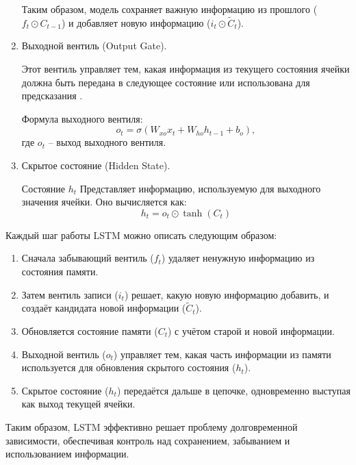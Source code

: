\documentclass[bachelor, och, coursework]{SCWorks}
\begin{document}
\begin{enumerate}
    Таким образом, модель сохраняет важную информацию из прошлого (\(f_t \odot C_{t-1}\)) и добавляет новую информацию (\(i_t \odot \tilde{C}_t\)).
 
    \item Выходной вентиль (Output Gate). 
    
    Этот вентиль управляет тем, какая информация из текущего состояния ячейки должна быть передана в следующее 
    состояние или использована для предсказания \cite{lstm1}.  
    
    Формула выходного вентиля:  
    \begin{equation}
        o_t = \sigma(W_{xo}x_t + W_{ho}h_{t-1} + b_o),
    \end{equation}
     где $o_t$ -- выход выходного вентиля.  
    
    \item Скрытое состояние (Hidden State).  
   
    Состояние $h_t$ Представляет информацию, используемую для выходного значения ячейки. Оно вычисляется как:  
    \begin{equation}
        h_t = o_t \odot \tanh(C_t)
    \end{equation}
  
  \end{enumerate}


  Каждый шаг работы LSTM можно описать следующим образом:  

  \begin{enumerate}
    \item Сначала забывающий вентиль (\(f_t\)) удаляет ненужную информацию из состояния памяти.  
    \item Затем вентиль записи (\(i_t\)) решает, какую новую информацию добавить, и создаёт кандидата новой информации (\(\tilde{C}_t\)).  
    \item Обновляется состояние памяти (\(C_t\)) с учётом старой и новой информации.  
    \item Выходной вентиль (\(o_t\)) управляет тем, какая часть информации из памяти используется для обновления скрытого состояния (\(h_t\)).  
    \item Скрытое состояние (\(h_t\)) передаётся дальше в цепочке, одновременно выступая как выход текущей ячейки.  
  \end{enumerate}

  Таким образом, LSTM эффективно решает проблему долговременной зависимости, обеспечивая контроль над сохранением, забыванием и использованием информации.
\end{document}
